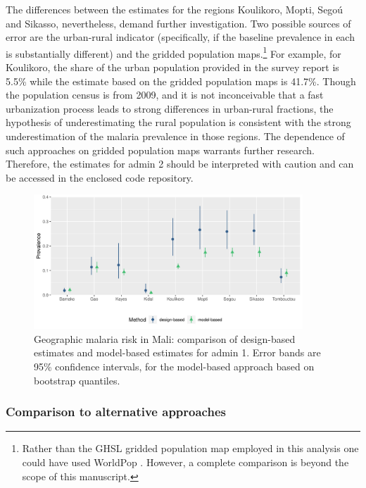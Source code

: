 The differences between the estimates for the regions Koulikoro, Mopti, Segoú and Sikasso, nevertheless, demand further investigation. Two possible sources of error are the urban-rural indicator (specifically, if the baseline prevalence in each is substantially different) and the gridded population maps.\footnote{Rather than the GHSL gridded population map employed in this analysis one could have used WorldPop \autocite{bondarenkoCensusProjectiondisaggregatedGridded2020}. However, a complete comparison is beyond the scope of this manuscript.} For example, for Koulikoro, the share of the urban population provided in the survey report is 5.5\% while the estimate based on the gridded population maps is 41.7\%. Though the population census is from 2009, and it is not inconceivable that a fast urbanization process leads to strong differences in urban-rural fractions, the hypothesis of underestimating the rural population is consistent with the strong underestimation of the malaria prevalence in those regions. The dependence of such approaches on gridded population maps warrants further research. Therefore, the estimates for admin 2 should be interpreted with caution and can be accessed in the enclosed code repository.

\begin{figure}[!t]
	\centering
	\includegraphics[width=0.9\textwidth, keepaspectratio]{figures/mali_estimatesadmin1.png}
	\caption{Geographic malaria risk in Mali: comparison of design-based estimates and model-based estimates for admin 1. Error bands are 95\% confidence intervals, for the model-based approach based on bootstrap quantiles.}
	\label{fig:mali_estimatesadmin1}
\end{figure}


\subsubsection*{Comparison to alternative approaches}

